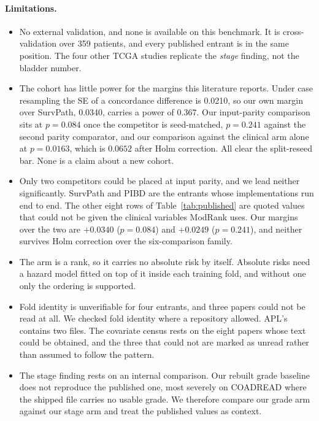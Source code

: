 \documentclass[11pt]{article}
\begin{document}
\paragraph{Limitations.}
\begin{itemize}
  \item No external validation, and none is available on this benchmark. It is
    cross-validation over 359 patients, and every published entrant is in the same position. The
    four other TCGA studies replicate the \emph{stage} finding, not the bladder number.
  \item The cohort has little power for the margins this literature reports. Under case
    resampling the SE of a concordance difference is 0.0210, so our own margin over SurvPath,
    0.0340, carries a power of 0.367. Our input-parity comparison sits at
    $p=0.084$ once the competitor is seed-matched, $p=0.241$ against the second parity
    comparator, and our comparison against the clinical arm alone at $p=0.0163$, which is
    $0.0652$ after Holm correction. All clear the split-reseed bar. None is a claim about a new
    cohort.
  \item Only two competitors could be placed at input parity, and we lead neither
    significantly. SurvPath and PIBD are the entrants whose implementations run end to end. The
    other eight rows of Table~\ref{tab:published} are quoted values that could not be given the clinical variables ModRank uses. Our margins over the two are $+0.0340$ ($p=0.084$) and
    $+0.0249$ ($p=0.241$), and neither survives Holm correction over the six-comparison family.
  \item The arm is a rank, so it carries no absolute risk by itself. Absolute risks need a hazard
    model fitted on top of it inside each training fold, and without one only the ordering is
    supported.
  \item Fold identity is unverifiable for four entrants, and three papers could not be read
    at all. We checked fold identity where a repository allowed. APL's contains two files. The
    covariate census rests on the eight papers whose text could be obtained, and the three that could not are marked as unread rather than assumed to follow the pattern.
  \item The stage finding rests on an internal comparison. Our rebuilt grade baseline does
    not reproduce the published one, most severely on COADREAD where the shipped file carries no
    usable grade. We therefore compare our grade arm against our stage arm and treat the published
    values as context.

\end{itemize}
\end{document}
